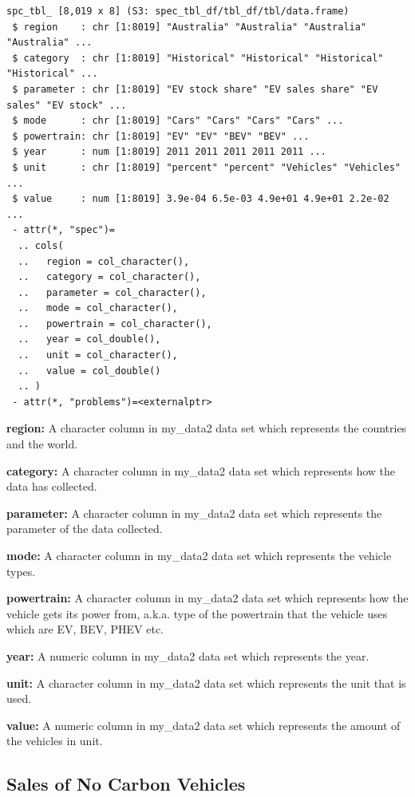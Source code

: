 \documentclass[
  11pt,
  a4paper,
  DIV=11,
  numbers=noendperiod]{scrartcl}
\begin{document}
\begin{verbatim}
spc_tbl_ [8,019 x 8] (S3: spec_tbl_df/tbl_df/tbl/data.frame)
 $ region    : chr [1:8019] "Australia" "Australia" "Australia" "Australia" ...
 $ category  : chr [1:8019] "Historical" "Historical" "Historical" "Historical" ...
 $ parameter : chr [1:8019] "EV stock share" "EV sales share" "EV sales" "EV stock" ...
 $ mode      : chr [1:8019] "Cars" "Cars" "Cars" "Cars" ...
 $ powertrain: chr [1:8019] "EV" "EV" "BEV" "BEV" ...
 $ year      : num [1:8019] 2011 2011 2011 2011 2011 ...
 $ unit      : chr [1:8019] "percent" "percent" "Vehicles" "Vehicles" ...
 $ value     : num [1:8019] 3.9e-04 6.5e-03 4.9e+01 4.9e+01 2.2e-02 ...
 - attr(*, "spec")=
  .. cols(
  ..   region = col_character(),
  ..   category = col_character(),
  ..   parameter = col_character(),
  ..   mode = col_character(),
  ..   powertrain = col_character(),
  ..   year = col_double(),
  ..   unit = col_character(),
  ..   value = col_double()
  .. )
 - attr(*, "problems")=<externalptr> 
\end{verbatim}

\textbf{region:} A character column in my\_data2 data set which
represents the countries and the world.

\textbf{category:} A character column in my\_data2 data set which
represents how the data has collected.

\textbf{parameter:} A character column in my\_data2 data set which
represents the parameter of the data collected.

\textbf{mode:} A character column in my\_data2 data set which represents
the vehicle types.

\textbf{powertrain:} A character column in my\_data2 data set which
represents how the vehicle gets its power from, a.k.a. type of the
powertrain that the vehicle uses which are EV, BEV, PHEV etc.

\textbf{year:} A numeric column in my\_data2 data set which represents
the year.

\textbf{unit:} A character column in my\_data2 data set which represents
the unit that is used.

\textbf{value:} A numeric column in my\_data2 data set which represents
the amount of the vehicles in unit.

\subsection{Sales of No Carbon
Vehicles}\label{sales-of-no-carbon-vehicles}
\end{document}
